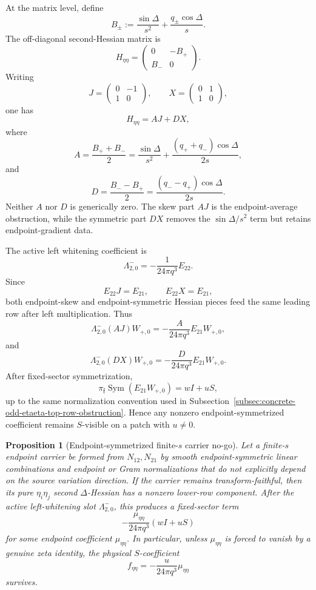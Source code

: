 \documentclass[11pt,a4paper]{amsart}
\theoremstyle{plain}
\newtheorem{proposition}[theorem]{Proposition}
\theoremstyle{definition}
\begin{document}
At the matrix level, define
\[
B_\pm
:=
\frac{\sin\Delta}{s^2}
+
\frac{q_\pm\cos\Delta}{s}.
\]
The off-diagonal second-Hessian matrix is
\[
H_{\eta\eta}
=
\begin{pmatrix}
0&-B_+\\
B_-&0
\end{pmatrix}.
\]
Writing
\[
J=
\begin{pmatrix}
0&-1\\
1&0
\end{pmatrix},
\qquad
X=
\begin{pmatrix}
0&1\\
1&0
\end{pmatrix},
\]
one has
\[
H_{\eta\eta}=AJ+DX,
\]
where
\[
A=\frac{B_++B_-}{2}
=
\frac{\sin\Delta}{s^2}
+
\frac{(q_++q_-)\cos\Delta}{2s},
\]
and
\[
D=\frac{B_- - B_+}{2}
=
\frac{(q_- - q_+)\cos\Delta}{2s}.
\]
Neither \(A\) nor \(D\) is generically zero.  The skew part \(AJ\) is the
endpoint-average obstruction, while the symmetric part \(DX\) removes the
\(\sin\Delta/s^2\) term but retains endpoint-gradient data.

The active left whitening coefficient is
\[
\Lambda^-_{2,0}
=
-\frac{1}{24\pi q^3}E_{22}.
\]
Since
\[
E_{22}J=E_{21},
\qquad
E_{22}X=E_{21},
\]
both endpoint-skew and endpoint-symmetric Hessian pieces feed the same leading
row after left multiplication.  Thus
\[
\Lambda^-_{2,0}(AJ)W_{+,0}
=
-\frac{A}{24\pi q^3}E_{21}W_{+,0},
\]
and
\[
\Lambda^-_{2,0}(DX)W_{+,0}
=
-\frac{D}{24\pi q^3}E_{21}W_{+,0}.
\]
After fixed-sector symmetrization,
\[
\pi_{\mathfrak f}\operatorname{Sym}(E_{21}W_{+,0})
=
wI+uS,
\]
up to the same normalization convention used in
Subsection~\ref{subsec:concrete-odd-etaeta-top-row-obstruction}.  Hence any
nonzero endpoint-symmetrized coefficient remains \(S\)-visible on a patch with
\(u\ne0\).

\begin{proposition}[Endpoint-symmetrized finite-\(s\) carrier no-go]
\label{prop:endpoint-symmetrized-carrier-no-go}
Let a finite-\(s\) endpoint carrier be formed from \(N_{12},N_{21}\) by smooth
endpoint-symmetric linear combinations and endpoint or Gram normalizations
that do not explicitly depend on the source variation direction.  If the
carrier remains transform-faithful, then its pure \(\eta_i\eta_j\) second
\(\Delta\)-Hessian has a nonzero lower-row component.  After the active
left-whitening slot \(\Lambda^-_{2,0}\), this produces a fixed-sector term
\[
-\frac{\mu_{\eta\eta}}{24\pi q^3}(wI+uS)
\]
for some endpoint coefficient \(\mu_{\eta\eta}\).  In particular, unless
\(\mu_{\eta\eta}\) is forced to vanish by a genuine zeta identity, the
physical \(S\)-coefficient
\[
f_{\eta\eta}
=
-\frac{u}{24\pi q^3}\mu_{\eta\eta}
\]
survives.
\end{proposition}
\end{document}
